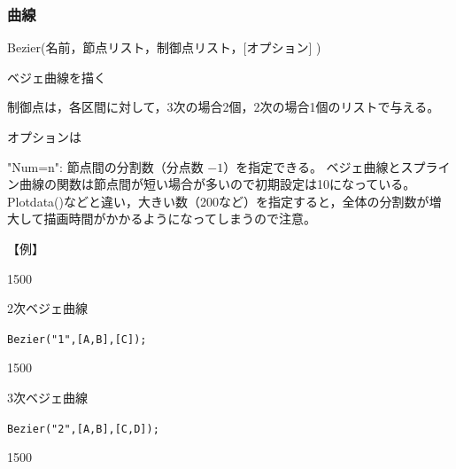 \documentclass[papersize,a4paper,10pt,uplatex]{jsarticle}
\begin{document}
\subsubsection{曲線}
\begin{description}

\hypertarget{bezier}{}
\item[関数]Bezier(名前，節点リスト，制御点リスト，[オプション] )
\item[機能]ベジェ曲線を描く
\item[説明]制御点は，各区間に対して，3次の場合2個，2次の場合1個のリストで与える。

オプションは

"Num=n": 節点間の分割数（分点数 $-1$）を指定できる。 ベジェ曲線とスプライン曲線の関数は節点間が短い場合が多いので初期設定は10になっている。Plotdata()などと違い，大きい数（200など）を指定すると，全体の分割数が増大して描画時間がかかるようになってしまうので注意。

\vspace{\baselineskip}
【例】

\begin{layer}{150}{0}
\end{layer}

2次ベジェ曲線

\verb|Bezier("1",[A,B],[C]);|

\vspace{10mm}

\begin{layer}{150}{0}
\end{layer}

3次ベジェ曲線

\verb|Bezier("2",[A,B],[C,D]);|

\vspace{15mm}

\begin{layer}{150}{0}
\end{layer}






\end{description}
\end{document}
